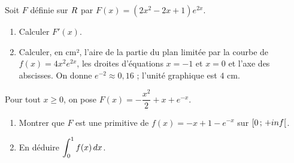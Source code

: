 \begin{annales}
Soit $F$ définie sur $R$ par $F(x) = \left(2x^{2}-2x+1\right)e^{2x}$.
\begin{enumerate}[label=\textbf{\alph*)}, leftmargin=*, itemsep=0.15em]
  \item Calculer $F'(x)$.
  \item Calculer, en cm², l'aire de la partie du plan limitée par la courbe
        de $f(x) = 4x^{2}e^{2x}$, les droites d'équations $x = -1$ et
        $x = 0$ et l'axe des abscisses. On donne
        $e^{-2} \approx 0{,}16$ ; l'unité graphique est $4$ cm.
\end{enumerate}

Pour tout $x \geq 0$, on pose $F(x) = -\dfrac{x^{2}}{2}+x+e^{-x}$.
\begin{enumerate}[label=\textbf{\alph*)}, leftmargin=*, itemsep=0.15em]
  \item Montrer que $F$ est une primitive de $f(x) = -x+1-e^{-x}$ sur
        $\left[0\,;\,+inf\right[$.
  \item En déduire $\displaystyle\int_{0}^{1} f(x)\,dx$.
\end{enumerate}
\end{annales}

